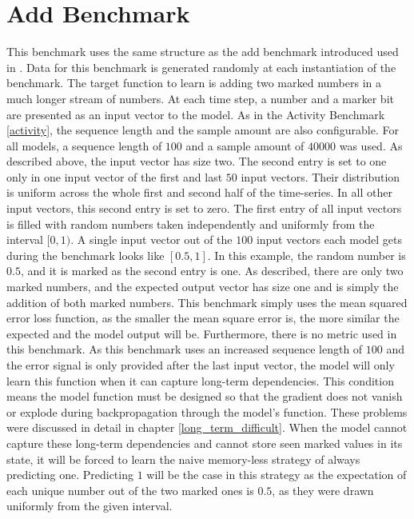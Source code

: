 \documentclass[draft,final]{vutinfth} %
\begin{document}
    \section{Add Benchmark} \label{add}
    This benchmark uses the same structure as the add benchmark introduced used in \cite{UnitaryRNNs}.
    Data for this benchmark is generated randomly at each instantiation of the benchmark.
    The target function to learn is adding two marked numbers in a much longer stream of numbers.
    At each time step, a number and a marker bit are presented as an input vector to the model.
    As in the Activity Benchmark \ref{activity}, the sequence length and the sample amount are also configurable.
    For all models, a sequence length of $100$ and a sample amount of $40000$ was used.
    As described above, the input vector has size two.
    The second entry is set to one only in one input vector of the first and last $50$ input vectors.
    Their distribution is uniform across the whole first and second half of the time-series.
    In all other input vectors, this second entry is set to zero. 
    The first entry of all input vectors is filled with random numbers taken independently and uniformly from the interval $[0,1)$.
    A single input vector out of the $100$ input vectors each model gets during the benchmark looks like $[0.5,1]$.
    In this example, the random number is $0.5$, and it is marked as the second entry is one.
    As described, there are only two marked numbers, and the expected output vector has size one and is simply the addition of both marked numbers.
    This benchmark simply uses the mean squared error loss function, as the smaller the mean square error is, the more similar the expected and the model output will be.
    Furthermore, there is no metric used in this benchmark.
    As this benchmark uses an increased sequence length of $100$ and the error signal is only provided after the last input vector, the model will only learn this function when it can capture long-term dependencies.
    This condition means the model function must be designed so that the gradient does not vanish or explode during backpropagation through the model's function.
    These problems were discussed in detail in chapter \ref{long_term_difficult}.
    When the model cannot capture these long-term dependencies and cannot store seen marked values in its state, it will be forced to learn the naive memory-less strategy of always predicting one.
    Predicting $1$ will be the case in this strategy as the expectation of each unique number out of the two marked ones is $0.5$, as they were drawn uniformly from the given interval.
\end{document}
